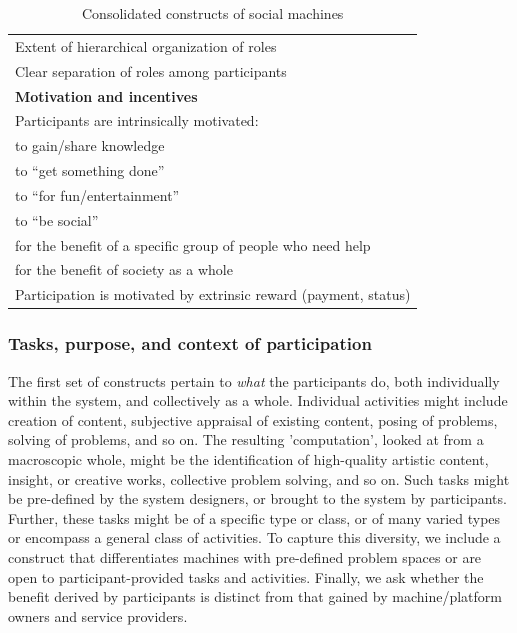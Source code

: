 \documentclass{sig-alternate}
\begin{document}
\begin{table}[htb]
\begin{center}
\begin{scriptsize}
\begin{tabular}{|p{8cm}|}
Extent of hierarchical organization of roles \\
Clear separation of roles among participants \\
{\bf Motivation and incentives} \\
\hline
Participants are intrinsically motivated:\\
\hspace{1cm} to gain/share knowledge \\
\hspace{1cm} to ``get something done'' \\
\hspace{1cm} to ``for fun/entertainment''\\
\hspace{1cm} to ``be social'' \\
\hspace{1cm} for the benefit of a specific group of people who need help \\
\hspace{1cm} for the benefit of society as a whole \\
Participation is motivated by extrinsic reward (payment, status) \\
\hline

\end{tabular}
\end{scriptsize}
\end{center}
\caption{Consolidated constructs of social machines} \label{table:constructs}
\end{table}

\subsubsection{Tasks, purpose, and context of participation}
The first set of constructs pertain to \emph{what} the participants
do, both individually within the system, and collectively as a whole.
Individual activities might include creation of content, subjective
appraisal of existing content, posing of problems, solving of
problems, and so on.  The resulting 'computation', looked at from a
macroscopic whole, might be the identification of high-quality
artistic content, insight, or creative works, collective problem
solving, and so on.  Such tasks might be pre-defined by the system
designers, or brought to the system by participants.  Further, these
tasks might be of a specific type or class, or of many varied types or
encompass a general class of activities.  To capture this diversity,
we include a construct that differentiates machines with pre-defined problem spaces or are open to participant-provided tasks and activities.  Finally, we ask whether the benefit derived by
participants is distinct from that gained by machine/platform owners
and service providers.
\end{document}
